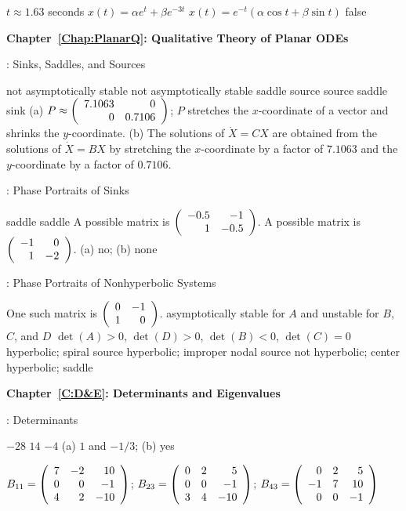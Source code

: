 \ans  $t \approx 1.63$ seconds
\ans $x(t) = \alpha e^t + \beta e^{-3t}$
\ans $x(t) = e^{-t}(\alpha \cos{t} + \beta \sin{t})$
 \ans false


\vspace{0.08in}
{\bf Chapter~\ref{Chap:PlanarQ}: Qualitative Theory of Planar ODEs}

: Sinks, Saddles, and Sources

 \ans not asymptotically stable
 \ans not asymptotically stable
 \ans saddle
 \ans source
 \ans source
 \ans saddle
 \ans sink
(a) \ans $P \approx \left(\begin{array}{rr} 7.1063 & 0\\ 0 &0.7106\end{array}\right)$;
$P$ stretches the $x$-coordinate of a vector and shrinks the $y$-coordinate.
(b) \ans The solutions of $\dot{X} = CX$ are obtained from the solutions
of $\dot{X} = BX$ by stretching the $x$-coordinate by a factor of $7.1063$
and the $y$-coordinate by a factor of $0.7106$.


: Phase Portraits of Sinks

 \ans saddle
 \ans saddle
\ans A possible matrix is $\left(\begin{array}{rr} -0.5 & -1\\ 1 &-0.5\end{array}\right)$.
\ans A possible matrix is $\left(\begin{array}{rr} -1 & 0\\ 1 &-2\end{array}\right)$.
 (a) no; (b) none


: Phase Portraits of Nonhyperbolic Systems

 \ans One such matrix is $\left(\begin{array}{rr} 0 & -1\\ 1 &0\end{array}\right)$.
 \ans asymptotically stable for $A$ and unstable
for $B$, $C$, and $D$
 \ans $\det(A)>0$, $\det(D)>0$, $\det(B)<0$, $\det(C)=0$
 \ans  hyperbolic; spiral source
 \ans  hyperbolic; improper nodal source
 \ans  not hyperbolic; center
 \ans hyperbolic; saddle


\vspace{0.08in}
{\bf Chapter~\ref{C:D&E}: Determinants and Eigenvalues}


: Determinants

 \ans $-28$
 \ans $14$
 \ans $-4$
 (a) \ans $1$ and $-1/3$; (b) \ans yes

$B_{11} = \left(\begin{array}{rrr} 7 & -2 & 10 \\ 0 & 0 & -1 \\ 4 & 2 & -10\end{array}\right)$;
$B_{23} = \left(\begin{array}{rrr} 0 & 2 & 5 \\ 0 & 0 & -1 \\ 3 & 4 & -10\end{array}\right)$;
$B_{43} = \left(\begin{array}{rrr} 0 & 2 & 5 \\ -1 & 7 & 10 \\ 0 & 0 & -1\end{array}\right)$


